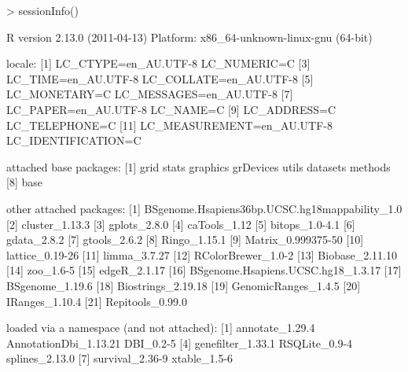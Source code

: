 \begin{Schunk}
\begin{Sinput}
> sessionInfo()
\end{Sinput}
\begin{Soutput}
R version 2.13.0 (2011-04-13)
Platform: x86_64-unknown-linux-gnu (64-bit)

locale:
 [1] LC_CTYPE=en_AU.UTF-8       LC_NUMERIC=C              
 [3] LC_TIME=en_AU.UTF-8        LC_COLLATE=en_AU.UTF-8    
 [5] LC_MONETARY=C              LC_MESSAGES=en_AU.UTF-8   
 [7] LC_PAPER=en_AU.UTF-8       LC_NAME=C                 
 [9] LC_ADDRESS=C               LC_TELEPHONE=C            
[11] LC_MEASUREMENT=en_AU.UTF-8 LC_IDENTIFICATION=C       

attached base packages:
[1] grid      stats     graphics  grDevices utils     datasets  methods  
[8] base     

other attached packages:
 [1] BSgenome.Hsapiens36bp.UCSC.hg18mappability_1.0
 [2] cluster_1.13.3                                
 [3] gplots_2.8.0                                  
 [4] caTools_1.12                                  
 [5] bitops_1.0-4.1                                
 [6] gdata_2.8.2                                   
 [7] gtools_2.6.2                                  
 [8] Ringo_1.15.1                                  
 [9] Matrix_0.999375-50                            
[10] lattice_0.19-26                               
[11] limma_3.7.27                                  
[12] RColorBrewer_1.0-2                            
[13] Biobase_2.11.10                               
[14] zoo_1.6-5                                     
[15] edgeR_2.1.17                                  
[16] BSgenome.Hsapiens.UCSC.hg18_1.3.17            
[17] BSgenome_1.19.6                               
[18] Biostrings_2.19.18                            
[19] GenomicRanges_1.4.5                           
[20] IRanges_1.10.4                                
[21] Repitools_0.99.0                              

loaded via a namespace (and not attached):
[1] annotate_1.29.4       AnnotationDbi_1.13.21 DBI_0.2-5            
[4] genefilter_1.33.1     RSQLite_0.9-4         splines_2.13.0       
[7] survival_2.36-9       xtable_1.5-6         
\end{Soutput}
\end{Schunk}

